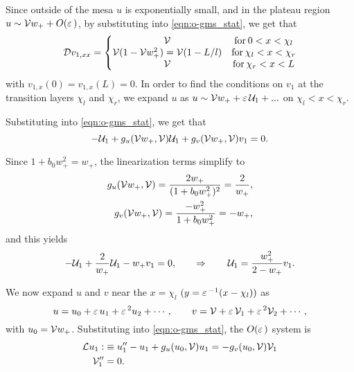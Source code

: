 Since outside of the mesa $u$ is exponentially small, and in the plateau region $u\sim\mathcal{V} w_+ + O(\varepsilon\,)$, by substituting into \eqref{eqn:o-gms_stat}, we get that
% 
\begin{equation}
\label{eqn:o-v1}
	\begin{split}
	\mathcal{D} v_{1,xx}
   = \left\{
	\begin{matrix}
		\mathcal{V}& \mathrm{for}\hspace{2pt}0< x<\chi_l \\
		\mathcal{V}(1-\mathcal{V} w_+^2) = \mathcal{V}(1-L/l)& \mathrm{for}\hspace{2pt}\chi_l< x<\chi_r\\
		\mathcal{V}& \mathrm{for}\hspace{2pt}\chi_r<x<L
	\end{matrix}\right.
	\end{split}
\end{equation}
% 
with $v_{1,x}(0) = v_{1,x}(L) = 0$. In order to find the conditions on $v_1$ at the transition layers $\chi_l$ and $\chi_r$, we expand $u$ as $u\sim\mathcal{V} w_+ + \varepsilon\,\mathcal{U}_1 + ...$ on $\chi_l<x<\chi_r$.

Substituting into \eqref{eqn:o-gms_stat}, we get that 
\[
-\mathcal{U}_1 + g_u(\mathcal{V} w_+,\mathcal{V})\mathcal{U}_1 + g_v(\mathcal{V} w_+,\mathcal{V})v_1 = 0.
\]

Since $1+b_0w_+^2 = w_+$, the linearization terms simplify to
% 
\begin{equation}
\label{eqn:derivs}
\begin{split}
\begin{aligned}
  g_u(\mathcal{V} w_+,\mathcal{V}) = \frac{2w_+}{(1+b_0w_+^2)^2} = \frac{2}{w_+},\\
  g_v(\mathcal{V} w_+,\mathcal{V}) = \frac{-w_+^2}{1+b_0w_+^2} = -w_+,
\end{aligned}
\end{split}
\end{equation}
% 
and this yields
$$
-\mathcal{U}_1 + \frac{2}{w_+}\mathcal{U}_1 - w_+v_1 = 0,\qquad \Rightarrow \qquad \mathcal{U}_1 = \frac{w_+^2}{2-w_+}v_1.
$$

We now expand $u$ and $v$ near the $x=\chi_l$ $(y=\varepsilon\,^{-1}(x-\chi_l))$ as
% 
\begin{equation*}
  u = u_0 + \varepsilon\, u_1 + \varepsilon\,^2 u_2+ \cdots,\qquad v = \mathcal{V} + \varepsilon\,\mathcal{V}_1 + \varepsilon\,^2\mathcal{V}_2+\cdots,
\end{equation*}
% 
with $u_0 = \mathcal{V} w_+$. Substituting into \eqref{eqn:o-gms_stat}, the $O(\varepsilon\,)$ system is
% 
\begin{equation}
\label{eqn:ord_epsilon}
\begin{split}
\begin{aligned}
  \mathcal{L} u_1:&\equiv u_1''-u_1 + g_u(u_0,\mathcal{V})u_1 = -g_v(u_0,\mathcal{V})\mathcal{V}_1 \\
  \mathcal{V}_1'' &= 0.
\end{aligned}
\end{split}
\end{equation}
% 

